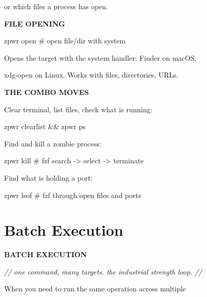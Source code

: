 \documentclass[11pt,a4paper,twoside]{book}
\begin{document}
or which files a process has open.


\vspace{12pt}
{\bfseries\color{neonyellow} FILE OPENING}\vspace{4pt}

\begin{codebox}
zpwr open                           \# open file/dir with system\\
\end{codebox}

Opens the target with the system handler: Finder on macOS,

xdg-open on Linux. Works with files, directories, URLs.


\vspace{12pt}
{\bfseries\color{neonyellow} THE COMBO MOVES}\vspace{4pt}

Clear terminal, list files, check what is running:

\begin{codebox}
zpwr clearlist \&\& zpwr ps\\
\end{codebox}

Find and kill a zombie process:

\begin{codebox}
zpwr kill     \# fzf search -> select -> terminate\\
\end{codebox}

Find what is holding a port:

\begin{codebox}
zpwr lsof     \# fzf through open files and ports\\
\end{codebox}


\vspace{16pt}

\section{Batch Execution}


\vspace{10pt}
{\large\bfseries\color{neoncyan} BATCH EXECUTION}\vspace{6pt}

{\small\itshape\color{dimtext} // one command, many targets. the industrial strength loop. //}

When you need to run the same operation across multiple
\end{document}
